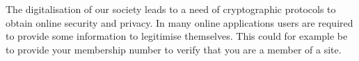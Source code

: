 \begin{comment}
Verifiable homomorphic secret sharing (VHASS) \cite{VHASS} is a protocol that verifies the servers computations is correct in homomorphic secret sharing protocol. 

\section{Previous work}
\cite{DRYNX}<- use for other similar approaches.


In this section the most relevant works which this paper builds upon will be briefly presented.
\subsection*{Verifiable additive homomorphic secret sharing}
This paper aims to extend the Verifiable additive homomorphic secret sharing (VHASS) construction presented in \cite{SumItUp} and further analysed in \cite{VHASS}, to also ensure honest clients. In this section we will give a brief review of their construction for VHASS  based on homomorphic hash functions to verify the servers computations. All details of this protocol can be found in the original paper \cite{SumItUp}.  

The aim of their protocol is to compute the sum $y=f(x_1,...,x_n)=\sum_{i=1}^n x_i$ of $n$ clients input denoted $x_i$ whiling keeping all $x_i$ secret and provide a proof $\sigma$ of the correctness of $y$. Each client split their secret $x_i$ between $m$ servers using homomorphic secret sharing, see section \ref{sec:secret_sharing}, such that no information about $x_i$ is obtained from any proper subset of the shares. The clients also computes and publishes $\tau_i=H(x_i+R_i)$, for a pseudorandom number $R_i$, $\tau_i$ will be used to verify the servers computations. Each servers computes the partial sum $y_j=\sum_{i=1}^n x_{ij}$ and a partial proof $\sigma_j$ and publishes $y_j$ and $\sigma_j$. Then any one can compute the sum of the clients input $y=\sum_{j=1}^m y_j$ and verify this sum is correct using $\sigma_j$ and $\tau_i$. This protocol assumes the clients are honest and does not provide any insurance that the clients input is correct and not malicious. 

\subsection*{Range Proofs}
Range proofs are used to verify that a value is withing a given range without reviling anything more about the value. 
Interactive / non-interactive. Move from general to wich one/ones we will cosider.

\end{comment}
The digitalisation of our society leads to a need of cryptographic protocols to obtain online security and privacy. In many   online applications users are required to provide some information to legitimise themselves. This could for example be to provide your membership number to verify that you are a member of a site. 

